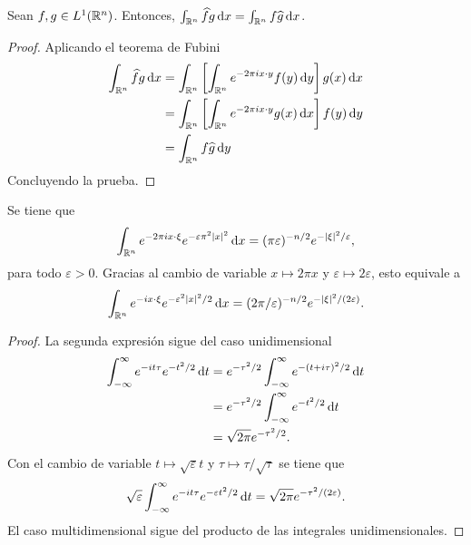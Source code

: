 \begin{lemma}
    Sean $f, g \in L^1(\mathbb{R}^n)$. Entonces, $\int_{\mathbb{R}^n}\widehat{f} g \mathop{}\!\mathrm{d} x 
    = \int_{\mathbb{R}^n} f \widehat{g} \mathop{}\!\mathrm{d} x$.
\end{lemma}
\begin{proof}
    Aplicando el teorema de Fubini 
    \begin{align*}
        \int_{\mathbb{R}^n}\widehat{f} g \mathop{}\!\mathrm{d} x & = \int_{\mathbb{R}^n} \left[
            \int_{\mathbb{R}^n} e^{-2\pi i x\cdot y} f(y) \mathop{}\!\mathrm{d} y
        \right] g(x) \mathop{}\!\mathrm{d} x \\
        & = \int_{\mathbb{R}^n} \left[
            \int_{\mathbb{R}^n} e^{-2\pi i x\cdot y} g(x) \mathop{}\!\mathrm{d} x
        \right] f(y) \mathop{}\!\mathrm{d} y \\ 
        & = \int_{\mathbb{R}^n} f \widehat{g} \mathop{}\!\mathrm{d} y
    \end{align*}
    Concluyendo la prueba.
\end{proof}
\begin{lemma}
    Se tiene que
    \begin{equation*}
       \int_{\mathbb{R}^n} e^{-2\pi i x \cdot \xi} e^{-\varepsilon\pi^2|x|^2}
        \mathop{}\!\mathrm{d} x = (\pi\varepsilon)^{-n/2} e^{-|\xi|^2/\varepsilon},  
    \end{equation*}
    para todo $\varepsilon > 0$. Gracias al cambio de variable 
    $x \mapsto 2\pi x$ y $\varepsilon \mapsto 2\varepsilon$, esto equivale a
    \begin{equation*}
       \int_{\mathbb{R}^n} e^{- i x \cdot \xi} e^{-\varepsilon^2|x|^2/2}
        \mathop{}\!\mathrm{d} x = (2\pi/\varepsilon)^{-n/2} e^{-|\xi|^2/(2\varepsilon)}. 
    \end{equation*}
\end{lemma}
\begin{proof}
    La segunda expresión sigue del caso unidimensional
    \begin{align*}
        \int_{-\infty}^{\infty} e^{-it\tau}e^{-t^2/2} \mathop{}\!\mathrm{d} t & = 
        e^{-\tau^2/2} \int_{-\infty}^{\infty} e^{-(t+i\tau)^2/2} \mathop{}\!\mathrm{d} t \\
        & = e^{-\tau^2/2} \int_{-\infty}^{\infty} e^{-t^2/2} \mathop{}\!\mathrm{d} t \\
        & = \sqrt{2\pi} e^{-\tau^2/2}.
    \end{align*}
    Con el cambio de variable $t\mapsto\sqrt{\varepsilon}t$ y 
    $\tau\mapsto\tau/\sqrt{\tau}$ se tiene que 
    \begin{equation*}
        \sqrt{\varepsilon}\int_{-\infty}^{\infty} e^{-it\tau}e^{-\varepsilon t^2/2} 
        \mathop{}\!\mathrm{d} t = 
        \sqrt{2\pi} e^{-\tau^2/(2\varepsilon)}.
    \end{equation*}
    El caso multidimensional sigue del producto de las integrales unidimensionales.
\end{proof}
